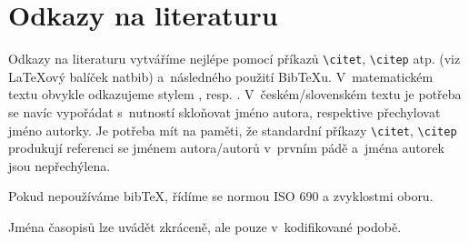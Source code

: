 
\chapter{Odkazy na literaturu}

Odkazy na literaturu vytváříme nejlépe pomocí příkazů
\verb|\citet|, \verb|\citep| atp.
(viz {\LaTeX}ový balíček \textsf{natbib}) a~následného použití
Bib{\TeX}u. V~matematickém textu obvykle odkazujeme stylem , resp. . V~českém/slovenském textu je potřeba se navíc vypořádat
s~nutností skloňovat jméno autora, respektive přechylovat jméno
autorky. Je potřeba mít na paměti, že standardní příkazy
\verb|\citet|, \verb|\citep|
produkují referenci se jménem autora/autorů v~prvním pádě a~jména
autorek jsou nepřechýlena.

Pokud nepoužíváme bib\TeX{}, řídíme se normou ISO 690 a zvyklostmi
oboru.

Jména časopisů lze uvádět zkráceně, ale pouze v~kodifikované podobě.
